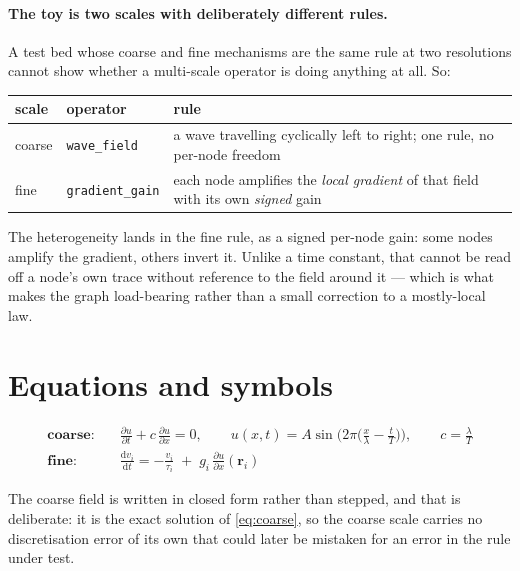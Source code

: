 \documentclass[11pt,a4paper]{article}
\newcommand{\op}[1]{\texttt{\small #1}}
\begin{document}
\paragraph{The toy is two scales with deliberately different rules.} A test bed whose coarse and
fine mechanisms are the same rule at two resolutions cannot show whether a multi-scale operator is
doing anything at all. So:

\begin{center}
\begin{tabularx}{\textwidth}{@{}p{1.9cm}p{3.3cm}L@{}}
\toprule
\textbf{scale} & \textbf{operator} & \textbf{rule} \\
\midrule
coarse & \op{wave\_field} & a wave travelling cyclically left to right; one rule, no per-node
  freedom \\
fine & \op{gradient\_gain} & each node amplifies the \emph{local gradient} of that field with its
  own \emph{signed} gain \\
\bottomrule
\end{tabularx}
\end{center}

\noindent
The heterogeneity lands in the fine rule, as a signed per-node gain: some nodes amplify the
gradient, others invert it. Unlike a time constant, that cannot be read off a node's own trace
without reference to the field around it --- which is what makes the graph load-bearing rather than
a small correction to a mostly-local law.

\section{Equations and symbols}

\begin{align}
\textbf{coarse:}\quad & \frac{\partial u}{\partial t} + c\,\frac{\partial u}{\partial x} = 0 ,
\qquad
u(x,t) = A \sin\!\Big(2\pi\Big(\frac{x}{\lambda} - \frac{t}{T}\Big)\Big) ,
\qquad c = \frac{\lambda}{T}
\label{eq:coarse}\\[4pt]
\textbf{fine:}\quad & \frac{\mathrm{d}v_i}{\mathrm{d}t}
   = -\frac{v_i}{\tau_i} \;+\; g_i \,\frac{\partial u}{\partial x}(\mathbf{r}_i)
\label{eq:fine}
\end{align}

The coarse field is written in closed form rather than stepped, and that is deliberate: it is the
exact solution of \eqref{eq:coarse}, so the coarse scale carries no discretisation error of its own
that could later be mistaken for an error in the rule under test.
\end{document}
